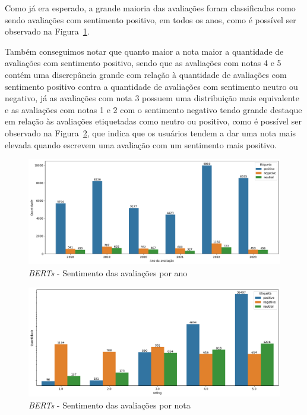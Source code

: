 Como já era esperado, a grande maioria das avaliações foram classificadas como sendo avaliações com sentimento positivo, em todos os anos, como é possível ser observado na Figura~\ref{img:sentimento_timechart_bert}.

Também conseguimos notar que quanto maior a nota maior a quantidade de avaliações com sentimento positivo, sendo que as avaliações com notas 4 e 5 contém uma discrepância grande com relação à quantidade de avaliações com sentimento positivo contra a quantidade de avaliações com sentimento neutro ou negativo, já as avaliações com nota 3 possuem uma distribuição mais equivalente e as avaliações com notas 1 e 2 com o sentimento negativo tendo grande destaque em relação às avaliações etiquetadas como neutro ou positivo, como é possível ser observado na Figura~\ref{img:sentimento_nota_bert}, que indica que os usuários tendem a dar uma nota mais elevada quando escrevem uma avaliação com um sentimento mais positivo.

\begin{figure}
	\centering
	\includegraphics[width=1\textwidth]{figs/bert/sentimento_ano.png}
	\caption{\textit{BERTs} - Sentimento das avaliações por ano}
	\label{img:sentimento_timechart_bert}
\end{figure}

\begin{figure}
	\centering
	\includegraphics[width=1\textwidth]{figs/bert/sentimento_nota.png}
	\caption{\textit{BERTs} - Sentimento das avaliações por nota}
	\label{img:sentimento_nota_bert}
\end{figure}

